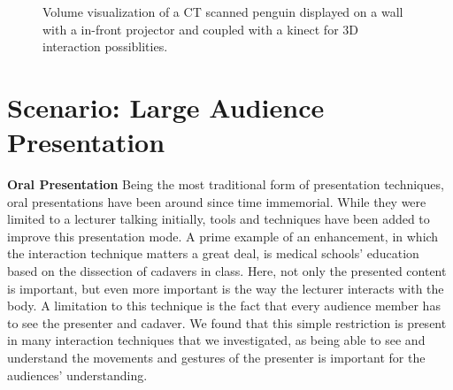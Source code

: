 \documentclass[review,journal]{vgtc}         %
\begin{document}
\begin{figure}[htb]
	\centering
	\caption{Volume visualization of a CT scanned penguin displayed on a wall with a in-front projector and coupled with a kinect for 3D interaction possiblities.}
	\label{img:exhibition_kinect}
\end{figure}

\section{Scenario: Large Audience Presentation}

\noindent \textbf{Oral Presentation} Being the most traditional form of presentation techniques, oral presentations have been around since time immemorial.
While they were limited to a lecturer talking initially, tools and techniques have been added to improve this presentation mode.
A prime example of an enhancement, in which the interaction technique matters a great deal, is medical schools' education based on the dissection of cadavers in class.
Here, not only the presented content is important, but even more important is the way the lecturer interacts with the body.
A limitation to this technique is the fact that every audience member has to see the presenter and cadaver.
We found that this simple restriction is present in many interaction techniques that we investigated, as being able to see and understand the movements and gestures of the presenter is important for the audiences' understanding.
\end{document}
